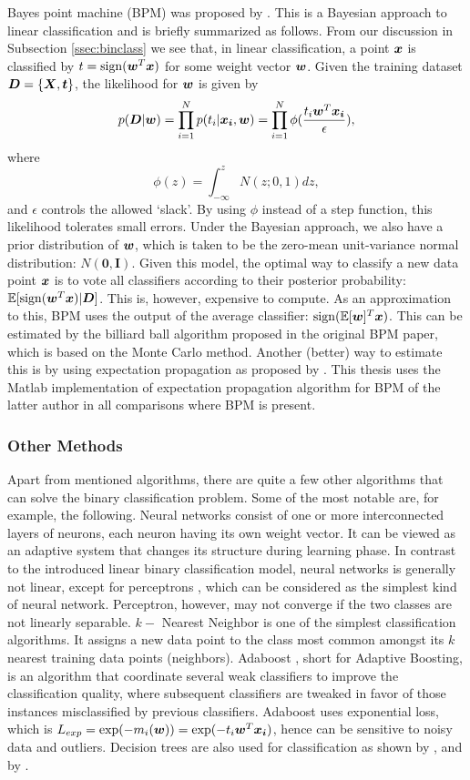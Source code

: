 Bayes point machine (BPM) was proposed by \cite{Herbrich}. This is a
Bayesian approach to linear classification and is briefly summarized
as follows. From our discussion in Subsection \ref{ssec:binclass} we
see that, in linear classification, a point $\boldsymbol{x}$ is classified by $t =
\operatorname{sign}(\boldsymbol{w}^T \boldsymbol{x})$ for some weight vector $\boldsymbol{w}$. Given the training
dataset $\boldsymbol{D} = \{\boldsymbol{X}, \boldsymbol{t} \}$, the likelihood for $\boldsymbol{w}$ is given by
$$p(\boldsymbol{D} | \boldsymbol{w}) = \prod_{i=1}^N p(t_i | \boldsymbol{x_i}, \boldsymbol{w}) = \prod_{i=1}^N
\phi(\frac{t_i\boldsymbol{w}^T\boldsymbol{x_i}}{\epsilon}),$$ where
$$\phi(z) = \int_{-\infty}^z N(z; 0, 1) dz,$$ and $\epsilon$ controls
the allowed `slack'. By using $\phi$ instead of a step function, this
likelihood tolerates small errors. Under the Bayesian approach, we
also have a prior distribution of $\boldsymbol{w}$, which is taken to be the
zero-mean unit-variance normal distribution: $N(\boldsymbol{0,
  I})$. Given this model, the optimal way to classify a new data point
$\boldsymbol{x}$ is to vote all classifiers according to their posterior
probability: $\mathbb{E}[\operatorname{sign}(\boldsymbol{w}^T \boldsymbol{x}) | \boldsymbol{D}]$. This is, however,
expensive to compute. As an approximation to this, BPM uses the output
of the average classifier: $\operatorname{sign}(\mathbb{E}[\boldsymbol{w}] ^T \boldsymbol{x})$. This can be
estimated by the billiard ball algorithm proposed in the original BPM
paper, which is based on the Monte Carlo method. Another (better) way
to estimate this is by using expectation propagation as proposed by
\cite{bpm}. This thesis uses the Matlab implementation of expectation
propagation algorithm for BPM of the latter author in all comparisons
where BPM is present.

\subsubsection{Other Methods}

Apart from mentioned algorithms, there are quite a few other
algorithms that can solve the binary classification problem. Some of
the most notable are, for example, the following. Neural networks
\cite{bishop2} consist of one or more interconnected layers of
neurons, each neuron having its own weight vector. It can be viewed as
an adaptive system that changes its structure during learning
phase. In contrast to the introduced linear binary classification
model, neural networks is generally not linear, except for perceptrons
\cite{perceptron}, which can be considered as the simplest kind of
neural network. Perceptron, however, may not converge if the two
classes are not linearly separable. $k-$ Nearest Neighbor \cite{kNN}
is one of the simplest classification algorithms. It assigns a new
data point to the class most common amongst its $k$ nearest training
data points (neighbors). Adaboost \cite{adaboost}, short for Adaptive
Boosting, is an algorithm that coordinate several weak classifiers to
improve the classification quality, where subsequent classifiers are
tweaked in favor of those instances misclassified by previous
classifiers. Adaboost uses exponential loss, which is $L_{exp} =
\exp(-m_i(\boldsymbol{w})) = \exp(-t_i\boldsymbol{w}^T\boldsymbol{x_i})$, hence can be sensitive to noisy
data and outliers. Decision trees are also used for classification as
shown by \cite{tree1}, and by \cite{tree2}.

